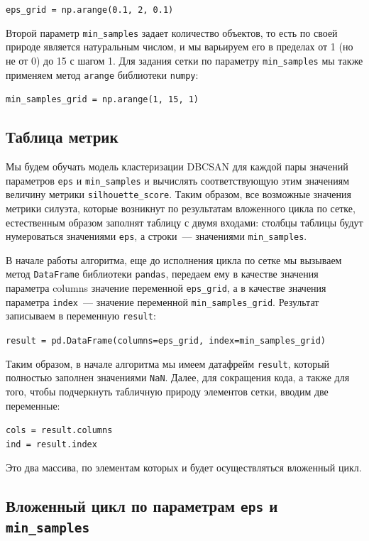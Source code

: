\documentclass[a4paper,12pt]{article}
\begin{document}
\medskip\noindent
\texttt{eps\_grid = np.arange(0.1, 2, 0.1)}

\medskip\noindent
Второй параметр \texttt{min\_samples} задает количество объектов, то есть по своей природе является натуральным числом, и мы варьируем его в пределах от 1 (но не от 0) до 15 с шагом 1. Для задания сетки по параметру \texttt{min\_samples} мы также применяем метод \texttt{arange} библиотеки \texttt{numpy}:

\medskip\noindent
\texttt{min\_samples\_grid = np.arange(1, 15, 1)}


\subsection{Таблица метрик}


Мы будем обучать модель кластеризации DBCSAN для каждой пары значений параметров \texttt{eps} и \texttt{min\_samples} и вычислять соответствующую этим значениям величину метрики \texttt{silhouette\_score}. Таким образом, все возможные значения метрики силуэта, которые возникнут по результатам вложенного цикла по сетке, естественным образом заполнят таблицу с двумя входами: столбцы таблицы будут нумероваться значениями \texttt{eps}, а строки — значениями \texttt{min\_samples}.

В начале работы алгоритма, еще до исполнения цикла по сетке мы вызываем метод \texttt{DataFrame} библиотеки \texttt{pandas}, передаем ему в качестве значения параметра columns значение переменной \texttt{eps\_grid}, а в качестве значения параметра \texttt{index} — значение переменной \texttt{min\_samples\_grid}. Результат записываем в переменную \texttt{result}:

\medskip\noindent
\texttt{result = pd.DataFrame(columns=eps\_grid, index=min\_samples\_grid)}

\medskip\noindent
Таким образом, в начале алгоритма мы имеем датафрейм \texttt{result}, который полностью заполнен значениями \texttt{NaN}. Далее, для сокращения кода, а также для того, чтобы подчеркнуть табличную природу элементов сетки, вводим две переменные:

\medskip\noindent
\texttt{cols = result.columns\\
ind = result.index}


\medskip\noindent
Это два массива, по элементам которых и будет осуществляться вложенный цикл.


\subsection{Вложенный цикл по параметрам \texttt{eps} и\\ \texttt{min\_samples}}
\end{document}
